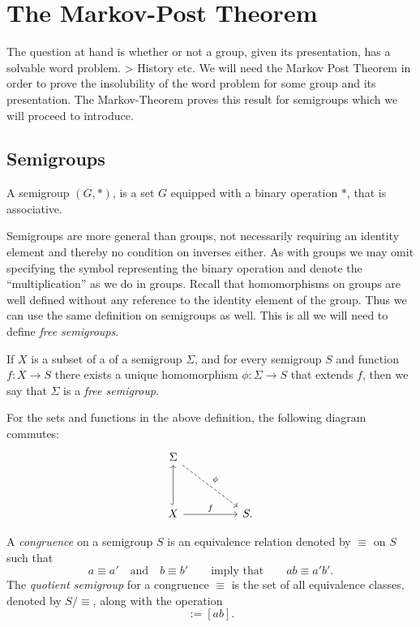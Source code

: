\section{The Markov-Post Theorem}
The question at hand is whether or not a group, given its presentation, has a solvable word problem.
> History etc.
We will need the Markov Post Theorem in order to prove the insolubility of the word problem for some group and its presentation. The Markov-Theorem proves this result for semigroups which we will proceed to introduce.

\subsection{Semigroups}
\label{sec:mpt:semi}

\begin{definition}
  A semigroup $(G,*)$, is a set $G$ equipped with a binary operation $*$, that is associative.
\end{definition}

Semigroups are more general than groups, not necessarily requiring an identity element and thereby no condition on inverses either. As with groups we may omit specifying the symbol representing the binary operation and denote the ``multiplication'' as we do in groups.
Recall that homomorphisms on groups are well defined without any reference to the identity element of the group. Thus we can use the same definition on semigroups as well. This is all we will need to define \emph{free semigroups}.

\begin{definition}
  If $X$ is a subset of a  of a semigroup $\Sigma$, and for every semigroup $S$ and function $f:X \rightarrow S$ there exists a unique homomorphism $\phi: \Sigma \rightarrow S$ that extends $f$, then we say that $\Sigma$ is a \emph{free semigroup}.
\end{definition}

For the sets and functions in the above definition, the following diagram commutes:
\begin{equation}
  \begin{tikzcd}[ampersand replacement=\&, sep=huge]
    \Sigma \arrow[dr,dashrightarrow,"\phi"] \\
    X \arrow[u,hook] \arrow[r,"f"] \& S.
  \end{tikzcd}
\end{equation}

\begin{definition}
  A \emph{congruence} on a semigroup $S$ is an equivalence relation denoted by $\equiv$ on $S$ such that
  \begin{equation*}
    a \equiv a' \quad\text{and}\quad b \equiv b' \qquad\text{imply that}\qquad ab \equiv a'b'.
  \end{equation*}
  The \emph{quotient semigroup} for a congruence $\equiv$ is the set of all equivalence classes, denoted by $S/\equiv$, along with the operation
  \begin{equation*}
    [a][b] := [ab].
  \end{equation*}
\end{definition}


